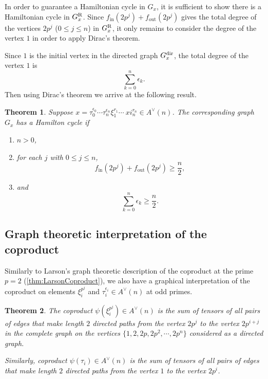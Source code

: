 \documentclass{amsart}
\newtheorem{theorem}{Theorem}[section]
\theoremstyle{definition}
\theoremstyle{plain}
\numberwithin{theorem}{section}
\numberwithin{equation}{section}
\numberwithin{figure}{section}
\DeclareMathOperator{\out}{out}
\DeclareMathOperator{\inn}{in}
\newcommand{\0}{\langle 0 \rangle }
\begin{document}
In order to guarantee a Hamiltonian cycle in $G_x$, it is sufficient to show there is a Hamiltonian cycle in $G_x^\textup{R}$. Since $f_{\inn}(2p^j) + f_{\out}(2p^j)$ gives the total degree of the vertices $2p^j$ ($0 \leq j \leq n$) in $G_x^\textup{R}$, it only remains to consider the degree of the vertex $1$ in order to apply Dirac's theorem. 

Since $1$ is the initial vertex in the directed graph $G_x^\textup{dir}$, the total degree of the vertex $1$ is \[
\sum_{k = 0}^n \epsilon_k.
\]
Then using Dirac's theorem we arrive at the following result. 

\begin{theorem} \label{thm:oddprimeHamilton}
    Suppose $x = \tau_0^{\epsilon_0} \cdots \tau_n^{\epsilon_n} \xi_1^{r_1} \cdots\ xi_n^{r_n} \in A^\vee(n)$. The corresponding graph $G_x$ has a Hamilton cycle if
    \begin{enumerate}
        \item $n>0$,
        \item for each $j$ with $0 \leq j \leq n$,
        \[
            f_{\inn}(2p^j) + f_{\out} (2p^j) \geq         \frac{n}{2}, 
        \]
        \item and \[\sum_{k=0}^n  \epsilon_k \geq \frac{n}{2}.\]
    \end{enumerate}  
\end{theorem}

\subsection{Graph theoretic interpretation of the coproduct} \label{sec:coprodOdd}

Similarly to Larson's graph theoretic description of the coproduct at the prime $p =2$ (\cref{thm:LarsonCoproduct}), we also have a graphical interpretation of the coproduct on elements $\xi_i^{p^j}$ and $\tau_i^{\epsilon_i} \in A^\vee (n)$ at odd primes. 
\begin{theorem} \label{thm:coproductOdd}
    The coproduct $\psi(\xi_i^{p^j}) \in A^\vee(n)$ is the sum of tensors of all pairs of edges that make length $2$ directed paths from the vertex $2 p^j$ to the vertex $2 p^{i +j}$ in the complete graph on the vertices $\{1, 2, 2p, 2p^2, \cdots, 2p^n \}$ considered as a directed graph.
     
    Similarly, coproduct $\psi(\tau_i) \in A^\vee(n)$ is the sum of tensors of all pairs of edges that make length $2$ directed paths from the vertex $1$ to the vertex $2 p^i$.
\end{theorem}
\end{document}
